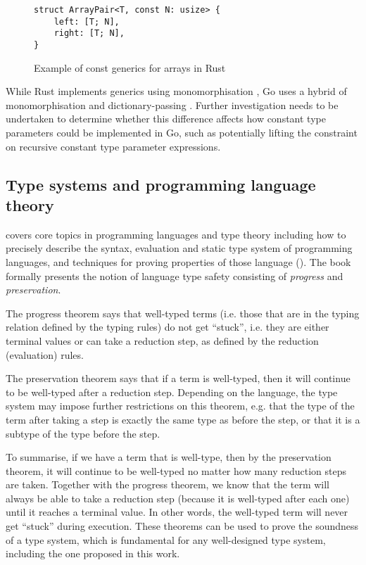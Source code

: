 \begin{figure}
    \begin{lstlisting}
struct ArrayPair<T, const N: usize> {
    left: [T; N],
    right: [T; N],
}
\end{lstlisting}
    \caption{Example of const generics for arrays in Rust \autocite{rustConstBlog}}
\end{figure}


While Rust implements generics using monomorphisation
\autocite{rustCompilerGuide}, Go uses a hybrid of monomorphisation and
dictionary-passing \autocite{generics1.18}. Further investigation needs to be
undertaken to determine whether this difference affects how constant type
parameters could be implemented in Go, such as potentially lifting the
constraint on recursive constant type parameter expressions.

\subsection{Type systems and programming language theory}

\citeauthor{tapl} covers core topics in programming languages and type theory
including how to precisely describe the syntax, evaluation and static type
system of programming languages, and techniques for proving properties of those
language (\citeyear{tapl}). The book formally presents the notion of language
type safety consisting of \emph{progress} and \emph{preservation}.

The progress theorem says that well-typed terms (i.e. those that are in the
typing relation defined by the typing rules) do not get ``stuck'', i.e. they are
either terminal values or can take a reduction step, as defined by the reduction
(evaluation) rules.

The preservation theorem says that if a term is well-typed, then it will
continue to be well-typed after a reduction step. Depending on the language,
the type system may impose further restrictions on this theorem, e.g. that
the type of the term after taking a step is exactly the same type as before
the step, or that it is a subtype of the type before the step.

To summarise, if we have a term that is well-type, then by the preservation
theorem, it will continue to be well-typed no matter how many reduction steps
are taken. Together with the progress theorem, we know that the term will always
be able to take a reduction step (because it is well-typed after each one) until
it reaches a terminal value. In other words, the well-typed term will never get
``stuck'' during execution. These theorems can be used to prove the soundness of
a type system, which is fundamental for any well-designed type system, including
the one proposed in this work.

